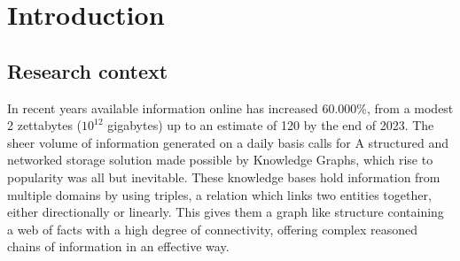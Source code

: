 \chapter{Introduction}\label{chap:introduction}



\section{Research context}\label{sec:intro-context}



 



In recent years available information online has increased 60.000\%, from a modest 2 zettabytes ($10^{12}$ gigabytes) up to an estimate of 120 by the end of 2023. The sheer volume of information generated on a daily basis calls for A structured and networked storage solution made possible by Knowledge Graphs, which rise to popularity was all but inevitable. These knowledge bases hold information from multiple domains by using triples, a relation which links two entities together, either directionally or linearly. This gives them a graph like structure containing a web of facts with a high degree of connectivity, offering complex reasoned chains of information in an effective way.

